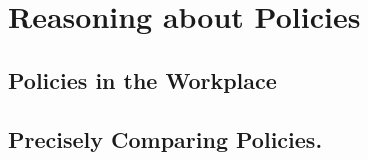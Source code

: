 \documentclass[thesis.tex]{subfiles}
\begin{document}
\chapter{Reasoning about Policies}

\section{Policies in the Workplace}

\section{Precisely Comparing Policies.}
\end{document}
